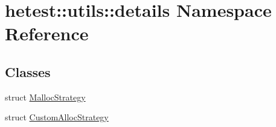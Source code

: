 \hypertarget{namespacehetest_1_1utils_1_1details}{\section{hetest\-:\-:utils\-:\-:details Namespace Reference}
\label{namespacehetest_1_1utils_1_1details}
}
\subsection*{Classes}
\begin{DoxyCompactItemize}
\item 
struct \hyperlink{structhetest_1_1utils_1_1details_1_1MallocStrategy}{Malloc\-Strategy}
\item 
struct \hyperlink{structhetest_1_1utils_1_1details_1_1CustomAllocStrategy}{Custom\-Alloc\-Strategy}
\end{DoxyCompactItemize}
